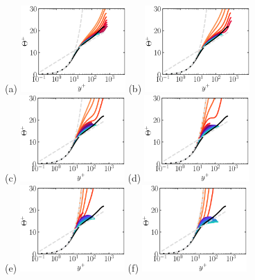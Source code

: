 \documentclass[lineno]{jfm}
\begin{document}
        \begin{figure}
        \centering
                (a) \includegraphics[width=4cm]{Figures/prof_ttplus_rotz0_roty0.00390625.eps}
                (b) \includegraphics[width=4cm]{Figures/prof_ttplus_rotz0_roty0.0078125.eps} \\
                (c) \includegraphics[width=4cm]{Figures/prof_ttplus_rotz0_roty0.015625.eps}
                (d) \includegraphics[width=4cm]{Figures/prof_ttplus_rotz0_roty0.03125.eps} \\
                (e) \includegraphics[width=4cm]{Figures/prof_ttplus_rotz0_roty0.0625.eps}
                (f) \includegraphics[width=4cm]{Figures/prof_ttplus_rotz0_roty0.125.eps} \\

\end{figure}
\end{document}
